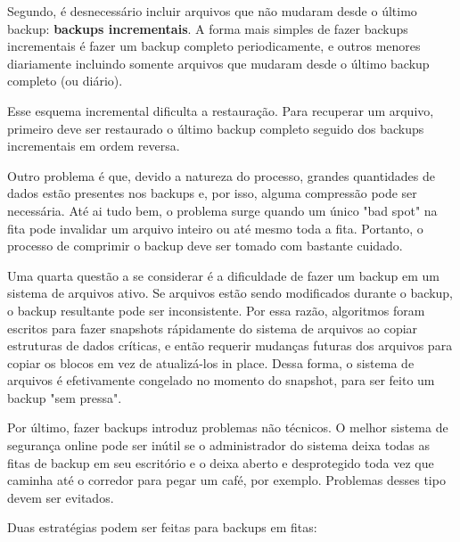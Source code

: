 \documentclass{article}
\begin{document}
Segundo, é desnecessário incluir arquivos que não mudaram desde o último backup: \textbf{backups incrementais}. A forma mais simples de fazer backups incrementais é fazer um backup completo periodicamente, e outros menores diariamente incluindo somente arquivos que mudaram desde o último backup completo (ou diário).

Esse esquema incremental dificulta a restauração. Para recuperar um arquivo, primeiro deve ser restaurado o último backup completo seguido dos backups incrementais em ordem reversa.

Outro problema é que, devido a natureza do processo, grandes quantidades de dados estão presentes nos backups e, por isso, alguma compressão pode ser necessária. Até ai tudo bem, o problema surge quando um único "bad spot" na fita pode invalidar um arquivo inteiro ou até mesmo toda a fita. Portanto, o processo de comprimir o backup deve ser tomado com bastante cuidado.

Uma quarta questão a se considerar é a dificuldade de fazer um backup em um sistema de arquivos ativo. Se arquivos estão sendo modificados durante o backup, o backup resultante pode ser inconsistente. Por essa razão, algoritmos foram escritos para fazer snapshots rápidamente do sistema de arquivos ao copiar estruturas de dados críticas, e então requerir mudanças futuras dos arquivos para copiar os blocos em vez de atualizá-los in place. Dessa forma, o sistema de arquivos é efetivamente congelado no momento do snapshot, para ser feito um backup "sem pressa".

Por último, fazer backups introduz problemas não técnicos. O melhor sistema de segurança online pode ser inútil se o administrador do sistema deixa todas as fitas de backup em seu escritório e o deixa aberto e desprotegido toda vez que caminha até o corredor para pegar um café, por exemplo. Problemas desses tipo devem ser evitados. 

Duas estratégias podem ser feitas para backups em fitas: 
\end{document}
